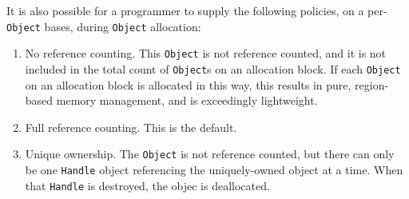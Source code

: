 It is also possible for a programmer to supply the following policies, on a per-\texttt{Object} bases, during \texttt{Object} allocation:

\begin{enumerate}

\item No reference counting.  This \texttt{Object} is not reference counted, and it is not included in the total count of \texttt{Object}s on an allocation
block.  If each \texttt{Object} on an allocation block
is allocated in this way, this results in pure, region-based memory management, and is exceedingly lightweight.
\item Full reference counting.  This is the default.
\item Unique ownership.  The \texttt{Object} is not reference counted, but there can only be one \texttt{Handle} object referencing the uniquely-owned
object at a time.  When that \texttt{Handle} is destroyed, the objec is deallocated.

\end{enumerate}


